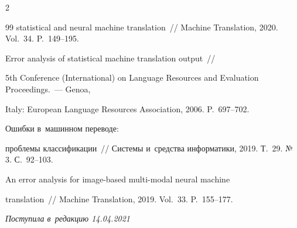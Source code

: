 \begin{multicols}{2}
{{\begin{thebibliography}{99}
statistical and neural machine translation~// Machine Translation, 2020. Vol.~34. P.~149--195.




 Error analysis of statistical machine translation output~// 


5th Conference (International) on Language Resources and Evaluation Proceedings.~--- Genoa, 


Italy: European Language Resources Association, 2006. P.~697--702.






 Ошибки в~машинном переводе: 


проблемы классификации~// Системы и~средства информатики, 2019. Т.~29. №\,3. С.~92--103.




 An error analysis for image-based multi-modal neural machine 


translation~// Machine Translation, 2019. Vol.~33. P.~155--177.


  \end{thebibliography}





}


}





\end{multicols}





\vspace*{-7pt}





\hfill{\small\textit{Поступила в~редакцию 14.04.2021}}















\newpage






